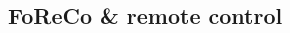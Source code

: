 \documentclass[a0,portrait]{a0poster}
\begin{document}
\begin{multicols}{2} %


\color{DarkSlateGray} %











\section*{FoReCo \& remote control}
\label{sec:foreco}


\end{multicols}
\end{document}
